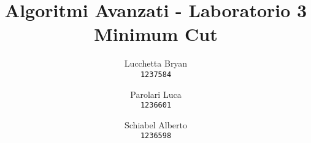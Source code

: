 \author{
  Lucchetta Bryan\\
  \texttt{1237584}
  \and
  Parolari Luca\\
  \texttt{1236601}
  \and
  Schiabel Alberto\\
  \texttt{1236598}
}

\title{Algoritmi Avanzati - Laboratorio 3 \\
  \large Minimum Cut}

\maketitle

\setcounter{tocdepth}{2}
{
  \hypersetup{linkcolor=black}
  \tableofcontents
  \listoffigures
  \listoftables
}
\protect\pagebreak[2]

